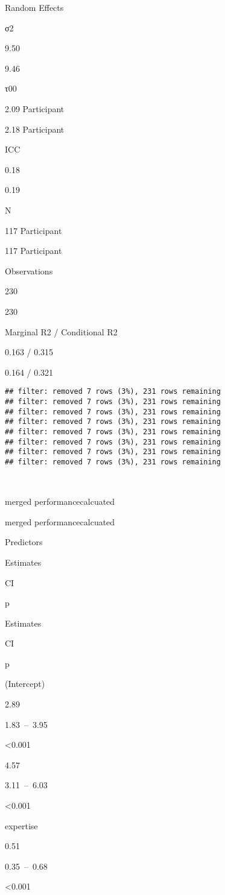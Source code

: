 \documentclass[
]{article}
\begin{document}
Random Effects

σ2

9.50

9.46

τ00

2.09 Participant

2.18 Participant

ICC

0.18

0.19

N

117 Participant

117 Participant

Observations

230

230

Marginal R2 / Conditional R2

0.163 / 0.315

0.164 / 0.321

\begin{verbatim}
## filter: removed 7 rows (3%), 231 rows remaining
## filter: removed 7 rows (3%), 231 rows remaining
## filter: removed 7 rows (3%), 231 rows remaining
## filter: removed 7 rows (3%), 231 rows remaining
## filter: removed 7 rows (3%), 231 rows remaining
## filter: removed 7 rows (3%), 231 rows remaining
## filter: removed 7 rows (3%), 231 rows remaining
## filter: removed 7 rows (3%), 231 rows remaining
\end{verbatim}

~

merged performancecalcuated

merged performancecalcuated

Predictors

Estimates

CI

p

Estimates

CI

p

(Intercept)

2.89

1.83~--~3.95

\textless0.001

4.57

3.11~--~6.03

\textless0.001

expertise

0.51

0.35~--~0.68

\textless0.001
\end{document}
